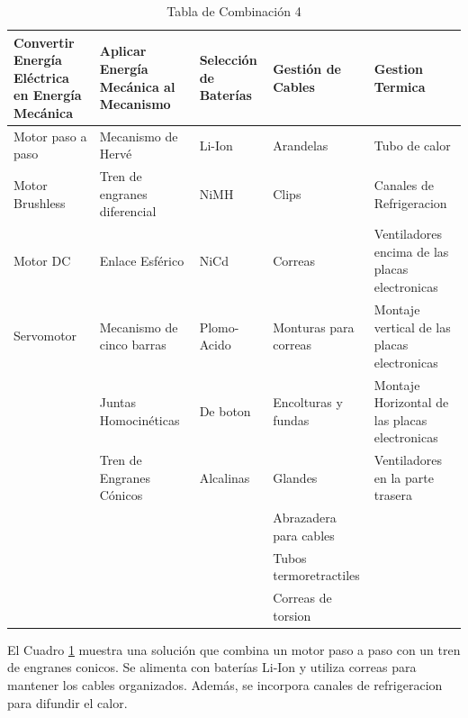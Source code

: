     \begin{table}[H]
    \centering
    \begin{tabularx}{\textwidth}{|X|X|X|X|X|}
    \hline
    \textbf{Convertir Energía Eléctrica en Energía Mecánica} & \textbf{Aplicar Energía Mecánica al Mecanismo} & \textbf{Selección de Baterías} & \textbf{Gestión de Cables} & \textbf{Gestion Termica} \\
    \hline
    \cellcolor{green}Motor paso a paso & Mecanismo de Hervé & \cellcolor{green}Li-Ion  & Arandelas & Tubo de calor\\
    \hline
    Motor Brushless & Tren de engranes diferencial & NiMH & Clips & \cellcolor{green}Canales de Refrigeracion \\
    \hline
    Motor DC & Enlace Esférico & NiCd & \cellcolor{green}Correas & Ventiladores encima de las placas electronicas\\
    \hline
    Servomotor & Mecanismo de cinco barras & Plomo-Acido & Monturas para correas & Montaje vertical de las placas electronicas\\
    \hline
     & Juntas Homocinéticas & De boton & Encolturas y fundas & Montaje Horizontal de las placas electronicas\\
    \hline
     & \cellcolor{green}Tren de Engranes Cónicos & Alcalinas & Glandes & Ventiladores en la parte trasera\\
    \hline
     & & & Abrazadera para cables & \\
    \hline
     & & & Tubos termoretractiles & \\
    \hline
     & & & Correas de torsion & \\
    \hline
    \end{tabularx}
    \caption{Tabla de Combinación 4}
    \label{tab:combinacion_4}
    \end{table} 

    El Cuadro \ref{tab:combinacion_4} muestra una solución que combina un motor paso a paso con un tren de engranes conicos. Se alimenta con baterías Li-Ion y utiliza correas para mantener los cables organizados. Además, se incorpora canales de refrigeracion para difundir el calor.

